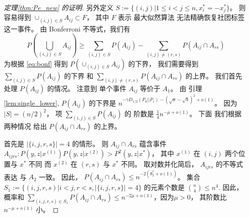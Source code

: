 \begin{proof}[定理\ref{thm:Pe_new} 的证明]
另外定义 $S:=\{(i,j)| 1\leq i < j\leq n,
x_i^*=-x_j^*
\}$。
则容易得到 $\cup_{(i,j) \in S} A_{ij} \subset F$，
其中 $F$ 表示 最大似然算法 无法精确恢复社团标签
这一事件。
由 Bonferroni 不等式，我们有
\begin{equation}\label{eq:bonf}
	P(\bigcup_{(i,j)\in S} A_{ij}) \geq
	\sum_{(i,j)\in S} P(A_{ij})
	- \sum_{(i,j) \neq (r,s)} P(A_{ij} \cap A_{rs})		
\end{equation}
为根据 \eqref{eq:bonf}
得到
$P(\cup_{(i,j)\in S} A_{ij})$
的下界，
我们需要得到 $\sum_{(i,j)\in S} P(A_{ij})$
的下界 和
$\sum_{(i,j) \neq (r,s)} P(A_{ij} \cap A_{rs})$
的上界。
我们首先 处理 $P(A_{ij})$ 的情况。
注意到 单个事件 $A_{ij}$
等价于 $A_1$。
由 引理 \ref{lem:single_lower},
$P(A_{ij})$ 的下界是
$n^{-\gamma D_{1/2}(P_0 || P_1)-(\sqrt{a} - \sqrt{b})^2 +o(1)}$。
因为
$|S|=(n/2)^2$，
项 $\sum_{(i,j) \in S} P(A_{ij})$ 的 阶数是 
$\frac{1}{4}n^{-\mu+o(1)}$。
下面 我们根据两种情况 给出 $P(A_{ij} \cap A_{rs})$ 的上界。

首先是  $|\{i,j,r,s\}|=4$
的情形。 则 $A_{ij} \cap A_{rs}$ 蕴含事件
$A_{ijrs}: P(y,z|x^{(1)})P(y,z|x^{(2)}) > P^2(y,z|x^*)$，
其中 $x^{(1)}$ 在 $(i,j)$ 两个位置与 $x^*$ 不同
而 $x^{(2)}$ 在 $(r,s)$ 与 $x^*$
不同。
取对数并化简后，
$A_{ijrs}$ 的不等式表达
与 $A_2$ 一致。
因此， $P(A_{ij} \cap A_{rs}) \leq n^{-2(\theta^*_2 + o(1))} $。
集合 $S_1:=\{(i,j,r,s)| i<j, r<s, |\{i,j,r,s\}|=4\}$
的元素个数是 $\binom{n}{4} \leq n^4$.
因此，概率和
$\sum_{(i,j,r,s) \in S_1} P(A_{ij} \cap A_{rs})
\leq n^{-2\mu +o(1)}$，因为$\mu > 0$，
其阶数比 $n^{-\mu+o(1)}$ 小。


\end{proof}
